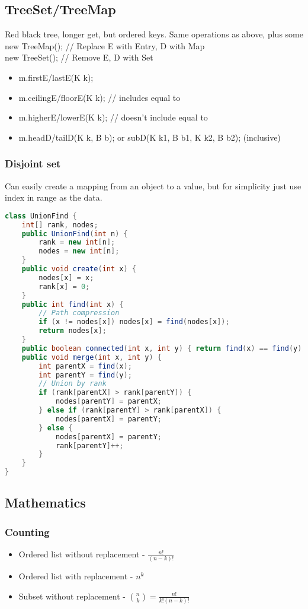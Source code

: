 \documentclass[10pt]{article}
\begin{document}
\subsection{TreeSet/TreeMap}
Red black tree, longer get, but ordered keys. Same operations as above, plus some\\
new TreeMap(); // Replace E with Entry, D with Map\\
new TreeSet(); // Remove E, D with Set
\begin{itemize}
    \itemsep0em
    \item m.firstE/lastE(K k);
    \item m.ceilingE/floorE(K k); // includes equal to
    \item m.higherE/lowerE(K k); // doesn't include equal to
    \item m.headD/tailD(K k, B b); or subD(K k1, B b1, K k2, B b2); (inclusive)
\end{itemize}

\subsubsection{Disjoint set}
Can easily create a mapping from an object to a value, but for simplicity just use index in range as the data.
\begin{lstlisting}[language=java]
class UnionFind {
    int[] rank, nodes;
    public UnionFind(int n) {
        rank = new int[n];
        nodes = new int[n];
    }
    public void create(int x) {
        nodes[x] = x;
        rank[x] = 0;
    }
    public int find(int x) {
        // Path compression
        if (x != nodes[x]) nodes[x] = find(nodes[x]);
        return nodes[x];
    }
    public boolean connected(int x, int y) { return find(x) == find(y); }
    public void merge(int x, int y) {
        int parentX = find(x);
        int parentY = find(y);
        // Union by rank
        if (rank[parentX] > rank[parentY]) {
            nodes[parentY] = parentX;
        } else if (rank[parentY] > rank[parentX]) {
            nodes[parentX] = parentY;
        } else {
            nodes[parentX] = parentY;
            rank[parentY]++;
        }
    }
}
\end{lstlisting}

\subsection{Mathematics}
\subsubsection{Counting}
\begin{itemize}
    \itemsep0em
    \item Ordered list without replacement - $\frac{n!}{(n-k)!}$
    \item Ordered list with replacement - $n^k$
    \item Subset without replacement - $\binom{n}{k} = \frac{n!}{k!(n-k)!}$
\end{itemize}
\end{document}
